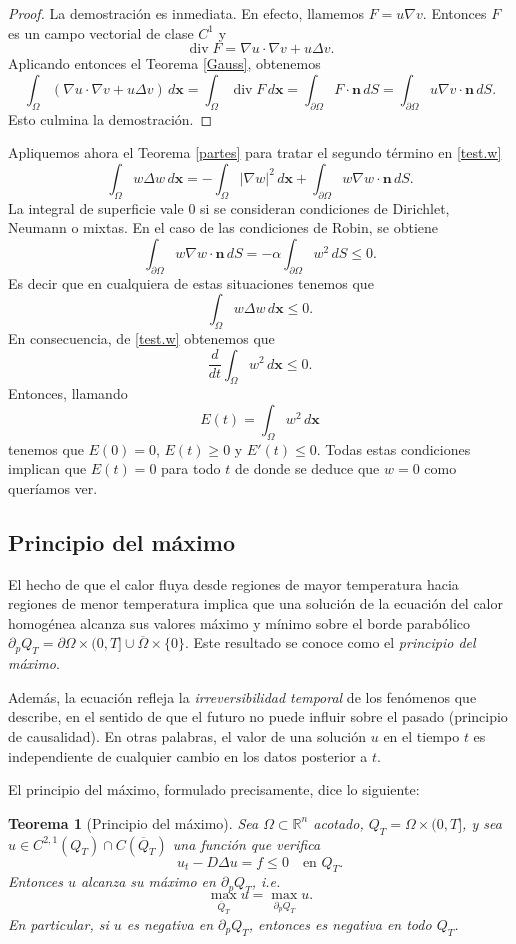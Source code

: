 \documentclass[12pt, a4paper]{amsbook}
\def\div{\operatorname {\mathrm{div}}}
\newcommand{\R}{{\mathbb R}}
\newcommand{\n}{{\mathbf n}}
\newcommand{\xx}{{\mathbf x}}
\newtheorem{teo}{Teorema}[section]
\theoremstyle{remark}
\theoremstyle{definition}
\numberwithin{section}{chapter}
\numberwithin{subsection}{section}
\numberwithin{equation}{section}
\numberwithin{figure}{chapter}
\begin{document}
\begin{proof}
La demostración es inmediata. En efecto, llamemos $F = u\nabla v$. Entonces $F$ es un campo vectorial de clase $C^1$ y
$$
\div F = \nabla u\cdot\nabla v + u\Delta v.
$$
Aplicando entonces el Teorema \ref{Gauss}, obtenemos
$$
\int_\Omega (\nabla u\cdot\nabla v + u\Delta v)\, d\xx = \int_\Omega \div F\, d\xx = \int_{\partial\Omega} F\cdot\n\, dS =  \int_{\partial\Omega} u \nabla v\cdot\n\, dS.
$$
Esto culmina la demostración.
\end{proof}

Apliquemos ahora el Teorema \ref{partes} para tratar el segundo término en \eqref{test.w}
$$
\int_\Omega w\Delta w\, d\xx = -\int_\Omega |\nabla w|^2\, d\xx + \int_{\partial\Omega} w\nabla w\cdot\n\, dS.
$$
La integral de superficie vale 0 si se consideran condiciones de Dirichlet, Neumann o mixtas. En el caso de las condiciones de Robin, se obtiene
$$
\int_{\partial\Omega} w\nabla w\cdot\n\, dS = -\alpha\int_{\partial\Omega} w^2\, dS\le 0.
$$
Es decir que en cualquiera de estas situaciones tenemos que
$$
\int_\Omega w\Delta w\, d\xx\le 0.
$$
En consecuencia, de \eqref{test.w} obtenemos que
$$
\frac{d}{dt}\int_\Omega w^2\, d\xx \le 0.
$$
Entonces, llamando
$$
E(t) = \int_\Omega w^2\, d\xx 
$$
tenemos que $E(0)=0$, $E(t)\ge 0$ y $E'(t)\le 0$. Todas estas condiciones implican que $E(t)=0$ para todo $t$ de donde se deduce que $w=0$ como queríamos ver.

\subsection{Principio del máximo}

El hecho de que el calor fluya desde regiones de mayor temperatura hacia regiones de menor temperatura implica que una solución de la ecuación del calor homogénea alcanza sus valores máximo y mínimo sobre el borde parabólico $\partial_p Q_T = \partial\Omega\times (0, T]\cup \overline\Omega\times\{0\}$. Este resultado se conoce como el {\em principio del máximo}.

Además, la ecuación refleja la {\em irreversibilidad temporal} de los fenómenos que describe, en el sentido de que el futuro no puede influir sobre el pasado (principio de causalidad). En otras palabras, el valor de una solución $u$ en el tiempo $t$ es independiente de cualquier cambio en los datos posterior a $t$.

El principio del máximo, formulado precisamente, dice lo siguiente:
\begin{teo}[Principio del máximo]\label{ppio.maximo}
Sea $\Omega\subset\R^n$ acotado, $Q_T=\Omega\times(0,T]$, y sea $u\in C^{2,1}(Q_T)\cap C(\overline{Q}_T)$ una función que verifica
$$
u_t - D\Delta u = f\le 0 \quad \text{en } Q_T.
$$
Entonces $u$ alcanza su máximo en $\partial_p Q_T$, i.e.
$$
\max_{\overline{Q}_T} u = \max_{\partial_p Q_T} u.
$$
En particular, si $u$ es negativa en $\partial_p Q_T$, entonces es negativa en todo $Q_T$.
\end{teo}
\end{document}
